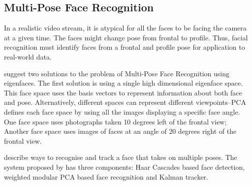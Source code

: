 \subsection{Multi-Pose Face Recognition}
  In a realistic video stream, it is atypical for all the faces to be facing the camera at a given time.
  The faces might change pose from frontal to profile.
  Thus, facial recognition must identify faces from a frontal and profile pose for application to real-world data.

  \citet{viewBasedFaceRecog} suggest two solutions to the problem of Multi-Pose Face Recognition using eigenfaces.
  The first solution is using a single high dimensional eigenface space.
  This face space uses the basis vectors to represent information about both face and pose.
  Alternatively, different spaces can represent different viewpoints--PCA defines each face space by using all the images displaying a specific face angle.
  One face space uses photographs taken 10 degrees left of the frontal view; Another face space uses images of faces at an angle of 20 degrees right of the frontal view.

  \citet{PoseFaceRec} describe ways to recognise and track a face that takes on multiple poses.
  The system proposed by \citet{PoseFaceRec} has three components: Haar Cascades based face detection, weighted modular PCA based face recognition and Kalman tracker.
